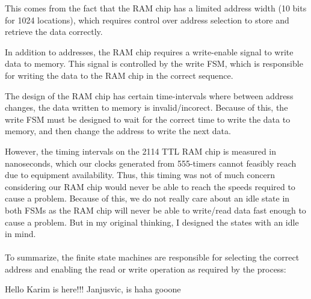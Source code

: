 \documentclass{article}
\begin{document}
        This comes from the fact that the RAM chip has a limited address width (10 bits for 1024 locations), which requires control over address selection to store and retrieve the data correctly.

        In addition to addresses, the RAM chip requires a write-enable signal to write data to memory. This signal is controlled by the write FSM, which is responsible for writing the data to the RAM chip in the correct sequence.

        The design of the RAM chip has certain time-intervals where between address changes, the data written to memory is invalid/incorect. Because of this, the write FSM must be designed to wait for the correct time to write the data to memory, and then change the address to write the next data.

        However, the timing intervals on the 2114 TTL RAM chip is measured in nanoseconds, which our clocks generated from 555-timers cannot feasibly reach due to equipment availability. Thus, this timing was not of much concern considering our RAM chip would never be able to reach the speeds required to cause a problem. 
        Because of this, we do not really care about an idle state in both FSMs as the RAM chip will never be able to write/read data fast enough to cause a problem. But in my original thinking, I designed the states with an idle in mind.\\~\\

        

        To summarize, the finite state machines are responsible for selecting the correct address and enabling the read or write operation as required by the process:

Hello Karim is here!!! Janjusvic, is haha gooone
\end{document}
